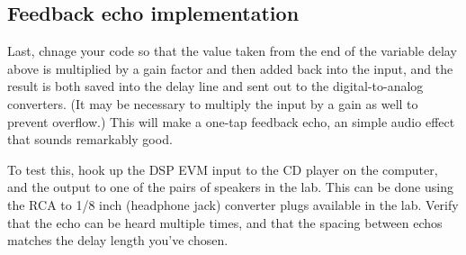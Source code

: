 \subsection{Feedback echo implementation}

Last, chnage your code so that the value taken from the end of
the variable delay above is multiplied by a gain factor and
then added back into the input, and the result is both saved
into the delay line and sent out to the digital-to-analog converters.
(It may be necessary to multiply
the input by a gain as well to prevent overflow.) This will make
a one-tap feedback echo, an simple audio effect that sounds remarkably
good.

To test this, hook up the DSP EVM input to the CD player on the
computer, and the output to one of the pairs of speakers in the
lab. This can be done using the RCA to 1/8 inch (headphone jack)
converter plugs available in the lab.
Verify that the echo can be heard multiple times, and that the
spacing between echos matches the delay length you've chosen.
